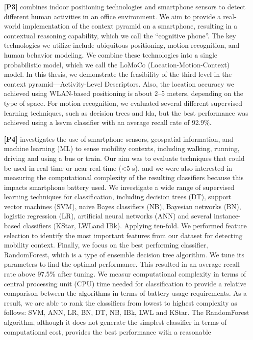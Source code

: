 \textbf{[P3]} combines indoor positioning technologies and smartphone sensors to detect different human activities in an office environment. We aim to provide a real-world implementation of the context pyramid on a smartphone, resulting in a contextual reasoning capability, which we call the ``cognitive phone''. The key technologies we utilize include ubiquitous positioning, motion recognition, and human behavior modeling. We combine these technologies into a single probabilistic model, which we call the LoMoCo (Location-Motion-Context) model. In this thesis, we demonstrate the feasibility of the third level in the context pyramid---Activity-Level Descriptors. Also, the location accuracy we achieved using WLAN-based positioning is about 2--5 meters, depending on the type of space. For motion recognition, we evaluated several different supervised learning techniques, such as decision trees and \gls{lda}, but the best performance was achieved using a \gls{lssvm} classifier with an average recall rate of 92.9\%.

\textbf{[P4]} investigates the use of smartphone sensors, geospatial information, and machine learning (ML) to sense mobility contexts, including walking, running, driving and using a bus or train. Our aim was to evaluate techniques that could be used  in real-time or  near-real-time (<5 s), and we were also interested in measuring the computational complexity of the resulting classifiers because this impacts smartphone battery used. We investigate a wide range of supervised learning techniques for
classification, including decision trees (DT), support vector machines (SVM), naive Bayes classifiers (NB), Bayesian networks (BN), logistic regression (LR), artificial neural networks (ANN) and several instance-based classifiers (KStar, LWLand IBk). Applying ten-fold. We performed feature selection to identify the most important features from our dataset for detecting mobility context. Finally, we focus on the best performing classifier, RandomForest, which is a type of ensemble decision tree algorithm. We tune its parameters to find the optimal performance. This resulted in an average recall rate above 97.5\% after tuning. We measur computational complexity in terms of central processing unit (CPU) time needed for classification to provide a relative comparison between the algorithms in terms of battery usage requirements. As a result, we are able to rank the classifiers from lowest to highest complexity as follows: SVM, ANN, LR, BN, DT, NB, IBk, LWL and KStar. The RandomForest algorithm, although it does not generate the simplest classifier in terms of computational cost, provides the best performance with a reasonable

